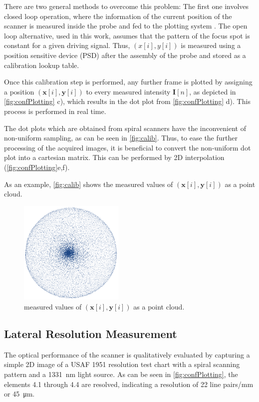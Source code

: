 There are two general methods to overcome this problem:
The first one involves closed loop operation, where the information of the current position of the scanner is measured inside the probe and fed to the plotting system \cite{Yeoh2014}. 
The open loop alternative, used in this work, assumes that the pattern of the focus spot is constant for a given driving signal. Thus, $(x[i], y[i])$ is measured using a position sensitive device (PSD) after the assembly of the probe and stored as a calibration lookup table. 

Once this calibration step is performed, any further frame is plotted by assigning a position $(\mathbf{x}[i], \mathbf{y}[i])$ to every measured intensity $\mathbf{I}[n]$, as depicted in \autoref{fig:confPlotting} c), which results in the dot plot from \autoref{fig:confPlotting} d). This process is performed in real time.

The dot plots which are obtained from spiral scanners have the inconvenient of non-uniform sampling, as can be seen in \autoref{fig:calib}. Thus, to ease the further processing of the acquired images, it is beneficial to convert the non-uniform dot plot into a cartesian matrix. This can be performed by 2D interpolation (\autoref{fig:confPlotting}e,f).

As an example, \autoref{fig:calib} shows the measured values of $(\mathbf{x}[i], \mathbf{y}[i])$ as a point cloud. 

\begin{figure}[h!]\centering \includegraphics[width=5cm]{figures/50_Measurements/conf/proc/samplingDensity.png}
      \caption{measured values of $(\mathbf{x}[i], \mathbf{y}[i])$ as a point cloud. }
      \label{fig:calib}
\end{figure}


\subsection{Lateral Resolution Measurement}
The optical performance of the scanner is qualitatively evaluated by capturing a simple 2D image of a USAF 1951 resolution test chart with a spiral scanning pattern and a \SI{1331}{\nano\meter} light source. As can be seen in \autoref{fig:confPlotting}, the elements 4.1 through 4.4 are resolved, indicating a resolution of 22 line pairs/mm or \SI{45}{\micro\meter}. 

